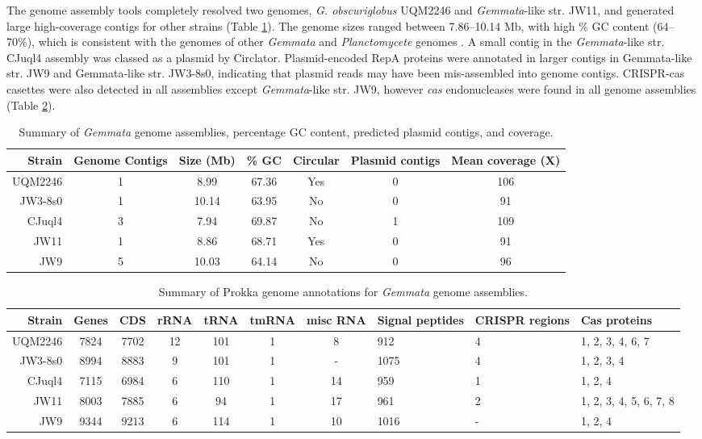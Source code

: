 The genome assembly tools completely resolved two genomes, \textit{G. obscuriglobus} UQM2246 and \textit{Gemmata}-like str. JW11, and generated large high-coverage contigs for other strains (Table \ref{tab:genome_stats}). The genome sizes ranged between 7.86--10.14 Mb, with high \% GC content (64--70\%), which is consistent with the genomes of other \textit{Gemmata} and \textit{Planctomycete} genomes \citep{Franke2018-ys}. A small contig in the \textit{Gemmata}-like str. CJuql4 assembly was classed as a plasmid by Circlator. Plasmid-encoded RepA proteins were annotated in larger contigs in Gemmata-like str. JW9 and Gemmata-like str. JW3-8s0, indicating that plasmid reads may have been mis-assembled into genome contigs. CRISPR-cas casettes were also detected in all assemblies except \textit{Gemmata}-like str. JW9, however \textit{cas} endonucleases were found in all genome assemblies (Table \ref{tab:annotation_stats}).

\begin{table}[H]
    \footnotesize
    \centering
\begin{tabular}{rcccccc}\toprule
Strain & Genome Contigs & Size (Mb) & \% GC &
Circular & Plasmid contigs & Mean coverage (X)\\
\midrule
UQM2246 & 1 & 8.99 & 67.36 & Yes & 0 & 106  \\
JW3-8s0 & 1 & 10.14 & 63.95 &  No & 0 & 91\\
CJuql4 & 3 & 7.94 & 69.87 & No & 1 & 109\\
JW11 & 1 & 8.86 &  68.71 & Yes & 0 & 91\\
JW9 & 5 & 10.03 & 64.14 & No & 0 & 96 \\
\bottomrule
    \end{tabular}
    \caption[Summary of \textit{Gemmata} genome assemblies]{Summary of \textit{Gemmata} genome assemblies, percentage GC content, predicted plasmid contigs, and coverage.}
    \label{tab:genome_stats}
\end{table}

\begin{table}[H]
    \footnotesize
    \centering
\begin{tabular}{rccccccp{1.2cm}p{1.2cm}p{1.15cm}}\toprule
Strain & Genes & CDS & rRNA & tRNA & tmRNA & misc RNA & Signal peptides & CRISPR regions & Cas proteins\\
\midrule
UQM2246 & 7824 & 7702 & 12 & 101 & 1 & 8 & 912 & 4 & 1, 2, 3, 4, 6, 7\\
JW3-8s0 & 8994 & 8883 & 9 & 101 & 1 & - & 1075 & 4 & 1, 2, 3, 4 \\
CJuql4 & 7115 & 6984 & 6 & 110 & 1 & 14 & 959 & 1 & 1, 2, 4\\
JW11 & 8003 & 7885 & 6 & 94 & 1 & 17 & 961 & 2 & 1, 2, 3, 4, 5, 6, 7, 8\\
JW9 & 9344 & 9213 & 6 & 114 & 1 & 10 & 1016 & - & 1, 2, 4\\
\bottomrule
    \end{tabular}
    \caption[Summary of Prokka genome annotations for \textit{Gemmata} genome assemblies]{Summary of Prokka genome annotations for \textit{Gemmata} genome assemblies.}
    \label{tab:annotation_stats}
\end{table}

